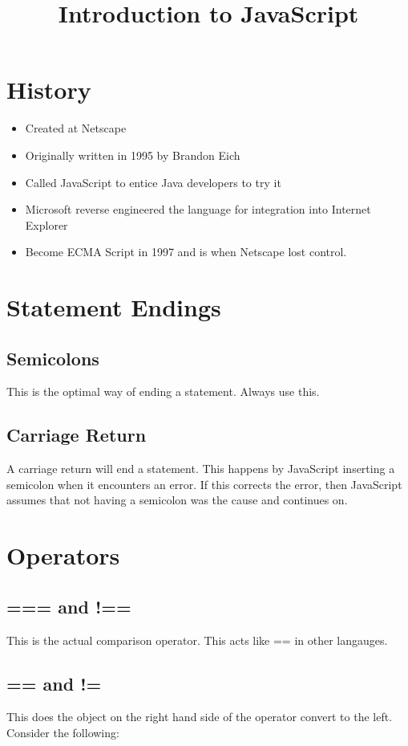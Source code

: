 \documentclass {article}
\title {Introduction to JavaScript}
\begin{document}
\maketitle

\section {History}

\begin{itemize}
	\item Created at Netscape
	\item Originally written in 1995 by Brandon Eich
	\item Called JavaScript to entice Java developers to try it
	\item Microsoft reverse engineered the language for integration into Internet Explorer
	\item Become ECMA Script in 1997 and is when Netscape lost control. 
\end{itemize}


\section{Statement Endings}
	\subsection{Semicolons}
		This is the optimal way of ending a statement.  Always use this.
	\subsection {Carriage Return}
		A carriage return will end a statement.  This happens by JavaScript inserting a semicolon when it encounters an error.  If this corrects the error, then JavaScript assumes that not having a semicolon was the cause and continues on. 


\section{Operators}
	\subsection{=== and !==}
		This is the actual comparison operator.  This acts like == in other langauges.
	\subsection{== and !=}
		This does the object on the right hand side of the operator convert to the left.  
		Consider the following: 
\end{document}
